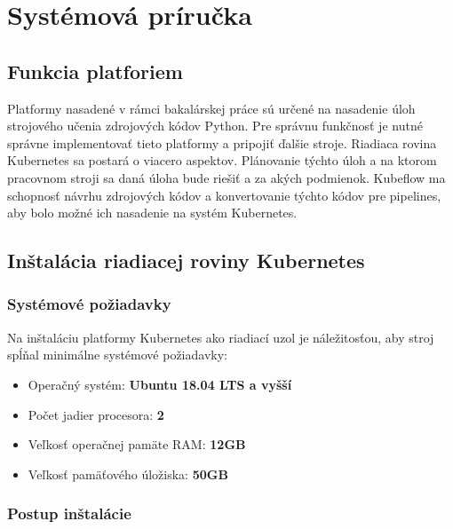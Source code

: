
\chapter{Systémová príručka}

\section{Funkcia platforiem}

Platformy nasadené v rámci bakalárskej práce sú určené na nasadenie úloh strojového učenia zdrojových kódov Python. Pre správnu funkčnosť je nutné správne implementovať tieto platformy a pripojiť ďalšie stroje. Riadiaca rovina Kubernetes sa postará o viacero aspektov. Plánovanie týchto úloh a na ktorom pracovnom stroji sa daná úloha bude riešiť a za akých podmienok. Kubeflow ma schopnosť návrhu zdrojových kódov a konvertovanie týchto kódov pre pipelines, aby bolo možné ich nasadenie na systém Kubernetes.

\section{Inštalácia riadiacej roviny Kubernetes}

\subsection*{Systémové požiadavky}

Na inštaláciu platformy Kubernetes ako riadiací uzol je náležitosťou, aby stroj spĺňal minimálne systémové požiadavky:

\begin{itemize}
    \item Operačný systém: \textbf{Ubuntu 18.04 LTS a vyšší}
	\item Počet jadier procesora: \textbf{2}
    \item Veľkosť operačnej pamäte RAM: \textbf{12GB}
    \item Veľkosť pamäťového úložiska: \textbf{50GB}
\end{itemize}

\subsection*{Postup inštalácie}
\label{sec:hello}

